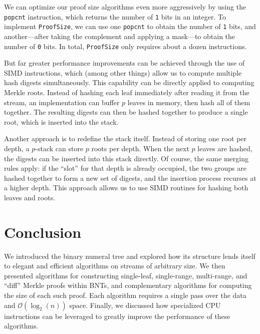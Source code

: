 \documentclass[twocolumn]{article}
\begin{document}
We can optimize our proof size algorithms even more aggressively by using the \verb`popcnt` instruction, which returns the number of \verb`1` bits in an integer. To implement \verb`ProofSize`, we can use one \verb`popcnt` to obtain the number of \verb`1` bits, and another---after taking the complement and applying a mask---to obtain the number of \verb`0` bits. In total, \verb`ProofSize` only requires about a dozen instructions.  %

But far greater performance improvements can be achieved through the use of SIMD instructions, which (among other things) allow us to compute multiple hash digests simultaneously. This capability can be directly applied to computing Merkle roots. Instead of hashing each leaf immediately after reading it from the stream, an implementation can buffer $p$ leaves in memory, then hash all of them together. The resulting digests can then be hashed together to produce a single root, which is inserted into the stack.

Another approach is to redefine the stack itself. Instead of storing one root per depth, a $p$-stack can store $p$ roots per depth. When the next $p$ leaves are hashed, the digests can be inserted into this stack directly. Of course, the same merging rules apply: if the ``slot'' for that depth is already occupied, the two groups are hashed together to form a new set of digests, and the insertion process recurses at a higher depth. This approach allows us to use SIMD routines for hashing both leaves and roots.



\section{Conclusion}

We introduced the binary numeral tree and explored how its structure lends itself to elegant and efficient algorithms on streams of arbitrary size. We then presented algorithms for constructing single-leaf, single-range, multi-range, and ``diff'' Merkle proofs within BNTs, and complementary algorithms for computing the size of each such proof. Each algorithm requires a single pass over the data and $\mathcal{O}(\log_2(n))$ space. Finally, we discussed how specialized CPU instructions can be leveraged to greatly improve the performance of these algorithms.
\end{document}
